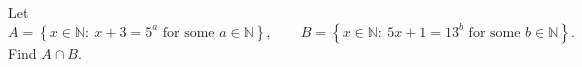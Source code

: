 Let
\[A=\left\{x\in\mathbb N:\ x+3=5^a\text{ for some }a\in\mathbb N\right\},\qquad B=\left\{x\in\mathbb N:\ 5x+1=13^b\text{ for some }b\in\mathbb N\right\}.\]
Find $A\cap B$.
